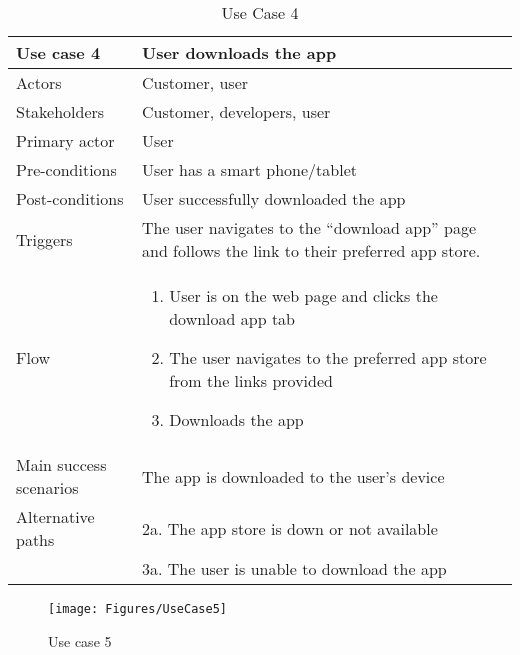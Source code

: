 \begin{table}[H]
\begin{tabular}{ | L{0.25\linewidth} | L{0.75\linewidth} | } 
 \hline {}
 Use case 4 & User downloads the app  \\ 
 \hline
 Actors & Customer, user \\ 
 \hline
 Stakeholders & Customer, developers, user \\ 
  \hline
 Primary actor & User  \\ 
 \hline
 Pre-conditions & User has a smart phone/tablet \\ 
 \hline
 Post-conditions & User successfully downloaded the app \\ 
  \hline
 Triggers & The user navigates to the “download app” page and follows the link to their preferred app store.  \\ 
 \hline
Flow & 
   \vspace{-5mm}
    \begin{enumerate}[noitemsep]
  \item User is on the web page and clicks the download app tab
  \item The user navigates to the preferred app store from the links provided
  \item Downloads the app
   \end{enumerate}\\ 
 \hline
 Main success scenarios & The app is downloaded to the user’s device \\ 
 \hline
 Alternative paths & 2a. The app store is down or not available \\
 & 3a. The user is unable to download the app\\
 \hline
\end{tabular}
\caption{Use Case 4}
\end{table}

\begin{figure}[H]
\centering
\texttt{[image: Figures/UseCase5]}
\caption{Use case 5}
    \label{fig:UC5}
    \end{figure}

